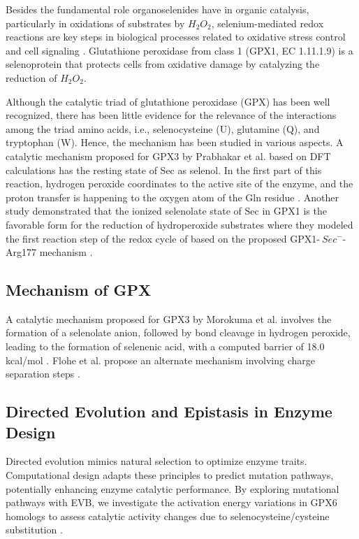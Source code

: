\documentclass[journal=jacsat,manuscript=article]{achemso}
\begin{document}
Besides the fundamental role organoselenides have in organic catalysis, particularly in oxidations of substrates by $H_{2} O_{2}$, selenium-mediated redox reactions are key steps in biological processes related to oxidative stress control and cell signaling \cite{14}. Glutathione peroxidase from class 1 (GPX1, EC 1.11.1.9) is a selenoprotein that protects cells from oxidative damage by catalyzing the reduction of $H_{2} O_{2}$.

Although the catalytic triad of glutathione peroxidase (GPX) has been well recognized, there has been little evidence for the relevance of the interactions among the triad amino acids, i.e., selenocysteine (U), glutamine (Q), and tryptophan (W). Hence, the mechanism has been studied in various aspects. A catalytic mechanism proposed for GPX3 by Prabhakar et al. based on DFT calculations has the resting state of Sec as selenol. In the first part of this reaction, hydrogen peroxide coordinates to the active site of the enzyme, and the proton transfer is happening to the oxygen atom of the Gln residue \cite{prabhakar_elucidation_2005, prabhakar_is_2006}. Another study demonstrated that the ionized selenolate state of Sec in GPX1 is the favorable form for the reduction of hydroperoxide substrates where they modeled the first reaction step of the redox cycle of based on the proposed GPX1-\({\ Sec^-}\)-Arg177 mechanism \cite{orian_selenocysteine_2015}. 

\subsection{Mechanism of GPX}

A catalytic mechanism proposed for GPX3 by Morokuma et al. involves the formation of a selenolate anion, followed by bond cleavage in hydrogen peroxide, leading to the formation of selenenic acid, with a computed barrier of 18.0 kcal/mol \cite{Prabhakar2006}. Flohe et al. propose an alternate mechanism involving charge separation steps \cite{Orian2015}.

\subsection{Directed Evolution and Epistasis in Enzyme Design}

Directed evolution mimics natural selection to optimize enzyme traits. Computational design adapts these principles to predict mutation pathways, potentially enhancing enzyme catalytic performance. By exploring mutational pathways with EVB, we investigate the activation energy variations in GPX6 homologs to assess catalytic activity changes due to selenocysteine/cysteine substitution \cite{Starr2016, Storz2018}.
\end{document}
